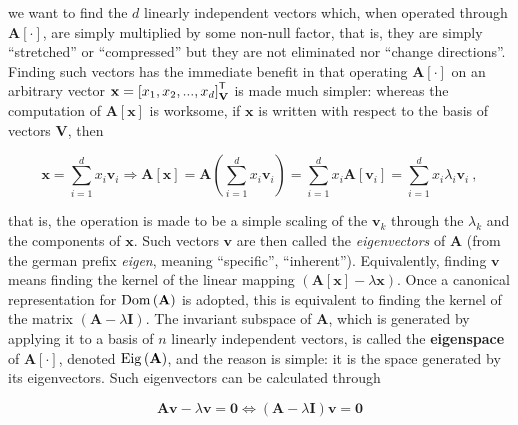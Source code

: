 	\noindent we want to find the $d$ linearly independent vectors which, when operated through $\mathbf{A}\left[\cdot\right]$, are simply multiplied by some non-null factor, that is, they are simply ``stretched'' or ``compressed'' but they are not eliminated nor ``change directions''. Finding such vectors has the immediate benefit in that operating $\mathbf{A}\left[\cdot\right]$ on an arbitrary vector $\mathbf{x} = \left[x_1,x_2,...,x_d\right]^{\mathsf{T}}_\mathbf{V}$ is made much simpler: whereas the computation of $\mathbf{A}\left[\mathbf{x}\right]$ is worksome, if $\mathbf{x}$ is written with respect to the basis of vectors $\mathbf{V}$, then

\begin{equation} \mathbf{x} = \sum\limits_{i=1}^d x_i\mathbf{v}_i \Rightarrow \mathbf{A}\left[\mathbf{x}\right] = \mathbf{A}\left(\sum\limits_{i=1}^d x_i\mathbf{v}_i\right) = \sum\limits_{i=1}^d x_i\mathbf{A}\left[\mathbf{v}_i\right] = \sum\limits_{i=1}^d x_i\lambda_i\mathbf{v}_i \ ,\end{equation}

	\noindent that is, the operation is made to be a simple scaling of the $\mathbf{v}_k$ through the $\lambda_k$ and the components of $\mathbf{x}$. Such vectors $\mathbf{v}$ are then called the \textit{eigenvectors} of $\mathbf{A}$ (from the german prefix \textit{eigen}, meaning ``specific'', ``inherent''). Equivalently, finding $\mathbf{v}$ means finding the kernel of the linear mapping $\left(\mathbf{A}\left[\mathbf{x}\right] - \lambda\mathbf{x}\right)$. Once a canonical representation for $\operatorname{Dom}\left(\mathbf{A}\right)$ is adopted, this is equivalent to finding the kernel of the matrix $\left(\mathbf{A} - \lambda\mathbf{I}\right)$. The invariant subspace of $\mathbf{A}$, which is generated by applying it to a basis of $n$ linearly independent vectors, is called the \textbf{eigenspace} of $\mathbf{A}\left[\cdot\right]$, denoted $\operatorname{Eig}\left(\mathbf{A}\right)$, and the reason is simple: it is the space generated by its eigenvectors. Such eigenvectors can be calculated through

\begin{equation} \mathbf{Av} - \lambda\mathbf{v} = \mathbf{0} \Leftrightarrow \left(\mathbf{A} - \lambda\mathbf{I}\right)\mathbf{v} = \mathbf{0} \label{eq:eigenvector_def} \end{equation}

